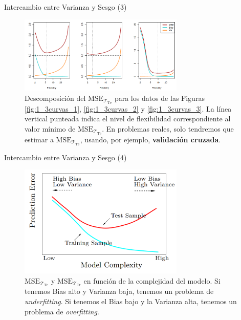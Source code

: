 \documentclass[usenames,dvipsnames]{beamer} %
\newcommand\defi[1]{\textcolor{NavyBlue}{\textit{#1}}}
\begin{document}
\begin{frame}{Intercambio entre Varianza y Sesgo (3)}
\begin{figure}
	\centering
	\includegraphics[width=0.7\textwidth]{images/islr/fig_2_12.png}
	\caption{Descomposici\'on del $\text{MSE}_{\mathcal{T}_{\text{Te}}}$ para los datos de las Figuras \ref{fig:1_3curvas_1}, \ref{fig:1_3curvas_2} y \ref{fig:1_3curvas_3}. La l\'inea vertical punteada indica el nivel de flexibilidad correspondiente al valor m\'inimo de $\text{MSE}_{\mathcal{T}_{\text{Te}}}$. En problemas reales, solo tendremos que estimar a $\text{MSE}_{\mathcal{T}_{\text{Te}}}$, usando, por ejemplo, \textbf{validaci\'on cruzada}.}
	\label{fig:1_int_b_var}
\end{figure}
\end{frame}

\begin{frame}{Intercambio entre Varianza y Sesgo (4)}
\begin{figure}
	\centering
	\includegraphics[width=0.7\textwidth]{images/esl/fig_2_11.PNG}
	\caption{ $\text{MSE}_{\mathcal{T}_{\text{Te}}}$ y $\text{MSE}_{\mathcal{T}_{\text{Tr}}}$ en funci\'on de la complejidad del modelo. Si tenemos Bias alto y Varianza baja, tenemos un problema de \defi{underfitting}. Si tenemos el Bias bajo y la Varianza alta, tenemos un problema de \defi{overfitting}.}
	\label{fig:1_over_under}
\end{figure}
\end{frame}
\end{document}
